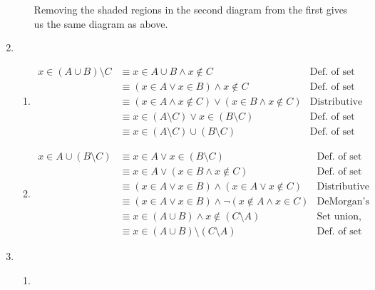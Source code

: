 \documentclass{article}
\begin{document}
\begin{enumerate}
\begin{enumerate}
    Removing the shaded regions in the second diagram from the first gives us the same diagram as above.
  \end{enumerate}
\item
  \begin{enumerate}
  \item
    \begin{equation*}
      \begin{aligned}
        x \in (A \cup B) \setminus C &\equiv x \in A \cup B \land x \notin C & \text{Def. of set difference} \\
        &\equiv (x \in A \lor x \in B) \land x \notin C & \text{Def. of set union} \\
        &\equiv (x \in A \land x \notin C) \lor (x \in B \land x \notin C) & \text{Distributive law} \\
        &\equiv x \in (A \setminus C) \lor x \in (B \setminus C) & \text{Def. of set difference} \\
        &\equiv x \in (A \setminus C) \cup (B \setminus C) & \text{Def. of set union}
      \end{aligned}
    \end{equation*}
  \item
    \begin{equation*}
      \begin{aligned}
        x \in A \cup (B \setminus C) &\equiv x \in A \lor x \in (B \setminus C) & \text{Def. of set union}\\
        &\equiv x \in A \lor (x \in B \land x \notin C) & \text{Def. of set difference}\\
        &\equiv (x \in A \lor x \in B) \land (x \in A \lor x \notin C) & \text{Distributive law}\\
        &\equiv (x \in A \lor x \in B) \land \lnot (x \notin A \land x \in C) & \text{DeMorgan's law}\\
        &\equiv x \in (A \cup B) \land x \notin (C \setminus A) & \text{Set union, difference}\\
        &\equiv x \in (A \cup B) \setminus(C \setminus A) & \text{Def. of set difference}
        \end{aligned}
      \end{equation*}
  \end{enumerate}
\item
  \begin{enumerate}
  \item
    \begin{equation*}
      \begin{aligned}

\end{aligned}
\end{equation*}
\end{enumerate}
\end{enumerate}
\end{document}
